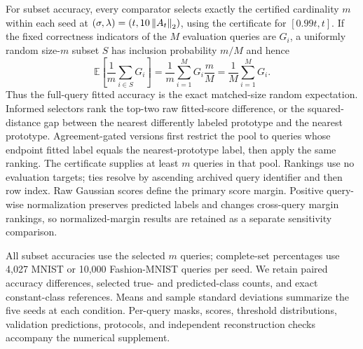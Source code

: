 For subset accuracy, every comparator selects exactly the certified cardinality $m$ within each seed at $(\sigma,\lambda)=(t,10\left\lVert A_t\right\rVert_2)$, using the certificate for $[0.99t,t]$. If the fixed correctness indicators of the $M$ evaluation queries are $G_i$, a uniformly random size-$m$ subset $S$ has inclusion probability $m/M$ and hence
\[
 \mathbb E\!\left[\frac1m\sum_{i\in S}G_i\right]
 =\frac1m\sum_{i=1}^{M}G_i\frac mM
 =\frac1M\sum_{i=1}^{M}G_i.
\]
Thus the full-query fitted accuracy is the exact matched-size random expectation. Informed selectors rank the top-two raw fitted-score difference, or the squared-distance gap between the nearest differently labeled prototype and the nearest prototype. Agreement-gated versions first restrict the pool to queries whose endpoint fitted label equals the nearest-prototype label, then apply the same ranking. The certificate supplies at least $m$ queries in that pool. Rankings use no evaluation targets; ties resolve by ascending archived query identifier and then row index. Raw Gaussian scores define the primary score margin. Positive query-wise normalization preserves predicted labels and changes cross-query margin rankings, so normalized-margin results are retained as a separate sensitivity comparison.

All subset accuracies use the selected $m$ queries; complete-set percentages use 4,027 MNIST or 10,000 Fashion-MNIST queries per seed. We retain paired accuracy differences, selected true- and predicted-class counts, and exact constant-class references. Means and sample standard deviations summarize the five seeds at each condition. Per-query masks, scores, threshold distributions, validation predictions, protocols, and independent reconstruction checks accompany the numerical supplement.
